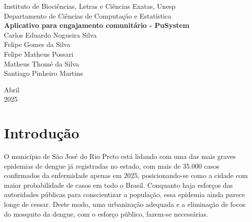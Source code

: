 \documentclass[a4paper, 12pt]{article}
\begin{document}

\begin{titlepage}
	\begin{center}
	

		\Huge{Instituto de Bioci\^{e}ncias, Letras e Ci\^{e}ncias Exatas, Unesp}\\
		\large{Departamento de Ciências de Computação e Estatística}\\ 
		
		\vspace{15pt}
        \vspace{95pt}
        \textbf{\LARGE{Aplicativo para engajamento comunitário - PuSystem}}\\
		\vspace{3,5cm}
        Carlos Eduardo Nogueira Silva \\
        Felipe Gomes da Silva \\
        Felipe Matheus Possari \\
        Matheus Thomé da Silva\\ 
        Santiago Pinheiro Martins \\
	\end{center}
	
	
	\vspace{1cm}
	\begin{center}
		\vspace{\fill}
		 Abril \\
		 2025
			\end{center}
\end{titlepage}

\newpage
\tableofcontents
\thispagestyle{empty}

\newpage
{}
\pagestyle{fancy}
\fancyhead[L]{\nouppercase{\leftmark}}
\setlength\headheight{26pt}


\section{Introdução}
O município de São José do Rio Preto está lidando com uma das mais graves epidemias de dengue já registradas no estado, com mais de 35.000 casos confirmados da enfermidade apenas em 2025, posicionando-se como a cidade com maior probabilidade de casos em todo o Brasil. Conquanto haja esforços das autoridades públicas para conscientizar a população, essa epidemia ainda parece longe de cessar. Deste modo, uma urbanização adequada e a eliminação de focos do mosquito da dengue, com o esforço público, fazem-se necessárias.
\end{document}
